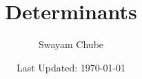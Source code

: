 \documentclass[11pt]{article}
\theoremstyle{thmstyle}
\theoremstyle{defstyle}
\newtheorem{definition}[theorem]{Definition}
\newcommand{\define}[1]{\textcolor{blue}{\textit{#1}}}
\renewcommand{\le}{\leqslant}
\renewcommand{\ge}{\geqslant}
\newcommand{\bbM}{\mathbb{M}}
\begin{document}
\title{Determinants}
\author{Swayam Chube}
\date{Last Updated: \today}
\maketitle
\tableofcontents





\end{document}
